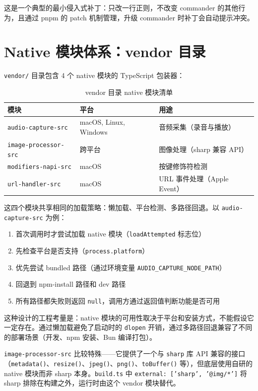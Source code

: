 这是一个典型的最小侵入式补丁：只改一行正则，不改变 commander 的其他行为，且通过 pnpm 的 patch 机制管理，升级 commander 时补丁会自动提示冲突。

\section{Native 模块体系：vendor 目录}

\texttt{vendor/} 目录包含 4 个 native 模块的 TypeScript 包装器：

\begin{table}[htbp]
\centering
\begin{tabularx}{\textwidth}{llX}
\toprule
\textbf{模块} & \textbf{平台} & \textbf{用途} \\
\midrule
\texttt{audio-capture-src} & macOS, Linux, Windows & 音频采集（录音与播放） \\
\texttt{image-processor-src} & 跨平台 & 图像处理（sharp 兼容 API） \\
\texttt{modifiers-napi-src} & macOS & 按键修饰符检测 \\
\texttt{url-handler-src} & macOS & URL 事件处理（Apple Event） \\
\bottomrule
\end{tabularx}
\caption{vendor 目录 native 模块清单}
\end{table}

这四个模块共享相同的加载策略：懒加载、平台检测、多路径回退。以 \texttt{audio-capture-src} 为例：

\begin{enumerate}
  \item 首次调用时才尝试加载 native 模块（\texttt{loadAttempted} 标志位）
  \item 先检查平台是否支持（\texttt{process.platform}）
  \item 优先尝试 bundled 路径（通过环境变量 \texttt{AUDIO\_CAPTURE\_NODE\_PATH}）
  \item 回退到 npm-install 路径和 dev 路径
  \item 所有路径都失败则返回 \texttt{null}，调用方通过返回值判断功能是否可用
\end{enumerate}

这种设计的工程考量是：native 模块的可用性取决于平台和安装方式，不能假设它一定存在。通过懒加载避免了启动时的 \texttt{dlopen} 开销，通过多路径回退兼容了不同的部署场景（开发、npm 安装、Bun 编译打包）。

\texttt{image-processor-src} 比较特殊——它提供了一个与 \texttt{sharp} 库 API 兼容的接口（\texttt{metadata()}、\texttt{resize()}、\texttt{jpeg()}、\texttt{png()}、\texttt{toBuffer()} 等），但底层使用自研的 native 模块而非 sharp 本身。\texttt{build.ts} 中 \texttt{external: ['sharp', '@img/*']} 将 sharp 排除在构建之外，运行时由这个 vendor 模块替代。
